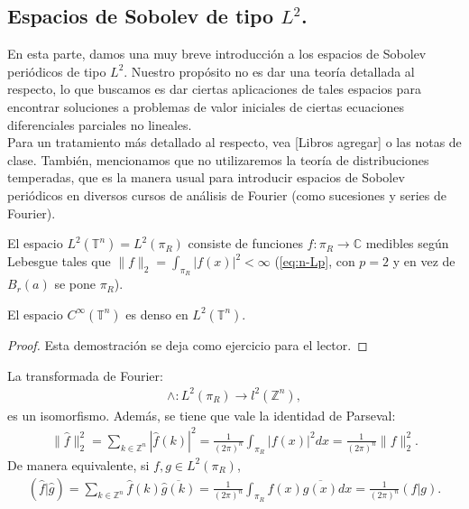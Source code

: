   \subsection{Espacios de Sobolev de tipo $L^2$.}
    En esta parte, damos una muy breve introducción a los espacios de Sobolev periódicos de tipo $L^2$. Nuestro propósito no es dar una teoría detallada al respecto, lo que buscamos es dar ciertas aplicaciones de tales espacios para encontrar soluciones a problemas de valor iniciales de ciertas ecuaciones diferenciales parciales no lineales.\\
    Para un tratamiento más detallado al respecto, vea [Libros agregar] o las notas de clase. También, mencionamos que no utilizaremos la teoría de distribuciones temperadas, que es la manera usual para introducir espacios de Sobolev periódicos en diversos cursos de análisis de Fourier (como sucesiones y series de Fourier).
    \begin{definition}
      El espacio $L^2(\mathbb{T}^{n})=L^{2}(\pi_R)$ consiste de funciones $f:\pi_R\to\mathbb{C}$ medibles según Lebesgue tales que $\|f\|_{2}=\int_{\pi_R}|f(x)|^2<\infty$ (\textcolor{red}{\ref{eq:n-Lp}}, con $p=2$ y en vez de $B_r(a)$ se pone $\pi_R$).  
    \end{definition}
    \begin{proposition}
      El espacio $C^{\infty}(\mathbb{T}^{n})$ es denso en $L^2(\mathbb{T}^{n})$.  
    \end{proposition}
    \begin{proof}
      Esta demostración se deja como ejercicio para el lector.  
    \end{proof}
    \begin{theorem}
      La transformada de Fourier:
      \begin{align*}
        \wedge:L^2(\pi_R)\to l^{2}(\mathbb{Z}^{n}),
      \end{align*}
      es un isomorfismo. Además, se tiene que vale la identidad de Parseval:
      \begin{align*}
        \|\hat{f}\|_{2}^{2}=\sum_{k\in\mathbb{Z}^{n}}|\hat{f}(k)|^2=\frac{1}{(2\pi)^n}\int_{\pi_R}|f(x)|^2dx=\frac{1}{(2\pi)^n}\|f\|_{2}^{2}.
      \end{align*}
      De manera equivalente, si $f,g\in L^{2}(\pi_R)$,
      \begin{align*}
        (\hat{f}|\hat{g})=\sum_{k\in\mathbb{Z}^{n}}\hat{f}(k)\overline{\hat{g}(k)}=\frac{1}{(2\pi)^n}\int_{\pi_R}f(x)\overline{g(x)}dx=\frac{1}{(2\pi)^n}(f|g).
      \end{align*}
    \end{theorem}
